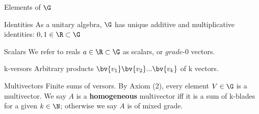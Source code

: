 \begin{definition}{Elements of $\G$}
    \begin{block}{Identities}
        As a unitary algebra, $\G$ has unique additive and multiplicative identities: $0, 1 \in \R \subset \G$
    \end{block}
    \begin{block}{Scalars}
        We refer to reals $a \in \R \subset \G$ as scalars, or $\textit{grade-0}$ vectors.
    \end{block}
    \begin{block}{k-versors}
        Arbitrary products $\bv{v_1}\bv{v_2}...\bv{v_k}$ of k vectors.
    \end{block}
    \begin{block}{Multivectors}
		Finite sums of versors. By Axiom (2), every element $V \in \G$ is a multivector. We say $A$ is a \textbf{homogeneous} multivector iff it is a sum of k-blades for a given $k \in \N$; otherwise we say $A$ is of mixed grade.
    \end{block}
\end{definition}
